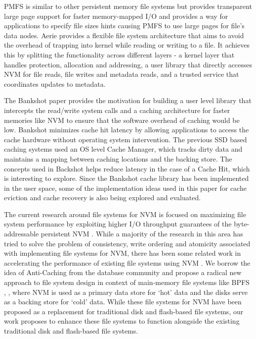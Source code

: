 PMFS \cite{c3} is similar to other persistent memory file systems but provides transparent large page support for faster memory-mapped I/O and provides a way for applications to specify file sizes hints causing PMFS to use large pages for file’s data nodes. Aerie \cite{c5} provides a flexible file system architecture that aims to avoid the overhead of trapping into kernel while reading or writing to a file. It achieves this by splitting the functionality across different layers - a kernel layer that handles protection, allocation and addressing, a user library that directly accesses NVM for file reads, file writes and metadata reads, and a trusted service that coordinates updates to metadata.  

The Bankshot paper\cite{c7} provides the motivation for building a user level library that intercepts the read/write system calls and a caching architecture for faster memories like NVM to ensure that the software overhead of caching would be low. Bankshot minimizes cache hit latency by allowing applications to access the cache hardware without operating system intervention. The previous SSD based caching systems used an OS level Cache Manager, which tracks dirty data and maintains a mapping between caching locations and the backing store. The concepts used in Backshot helps reduce latency in the case of a Cache Hit, which is interesting to explore. Since the Bankshot cache library has been implemented in the user space, some of the implementation ideas used in this paper for cache eviction and cache recovery is also being explored and evaluated. 
 
The current research around file systems for NVM is focused on maximizing file system performance by exploiting higher I/O throughput guarantees of the byte-addressable persistent NVM \cite{c10,c8,c3,c5}. While a majority of the research in this area has tried to solve the problem of consistency, write ordering and atomicity associated with implementing file systems for NVM, there has been some related work in accelerating the performance of existing file systems using NVM \cite{c11, c12}. We borrow the idea of Anti-Caching \cite{c13} from the database community and propose a radical new approach to file system design in context of main-memory file systems like BPFS \cite{c10}, \cite{c8}, where NVM is used as a primary data store for ‘hot’ data and the disks serve as a backing store for ‘cold’ data. While these file systems for NVM have been proposed as a replacement for traditional disk and flash-based file systems, our work proposes to enhance these file systems to function alongside the existing traditional disk and flash-based file systems. 

